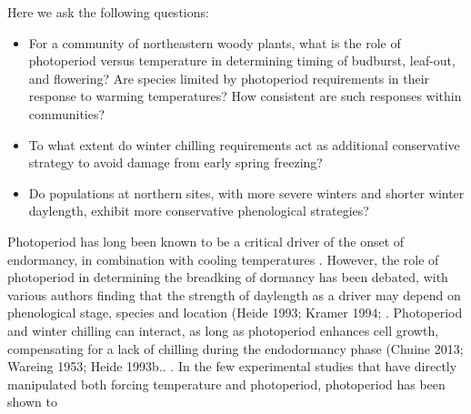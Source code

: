 \documentclass{article}
\begin{document}
Here we ask the following questions:
\begin{itemize}
\item{For a community of northeastern woody plants, what is the role of photoperiod versus temperature in determining timing of budburst, leaf-out, and flowering? Are species limited by photoperiod requirements in their response to warming temperatures? How consistent are such responses within communities?}
\item{To what extent do winter chilling requirements act as additional conservative strategy to avoid damage from early spring freezing?}
\item{Do populations at northern sites, with more severe winters and shorter winter daylength, exhibit more conservative phenological strategies?}
\end{itemize}


Photoperiod has long been known to be a critical driver of the onset of endormancy, in combination with cooling temperatures \cite{Foley:2009aa}. However, the role of photoperiod in determining the breadking of dormancy has been debated, with various authors finding that the strength of daylength as a driver may depend on phenological stage, species and location (Heide 1993; Kramer 1994; \cite{Falusi:1996aa}. Photoperiod and winter chilling can interact, as long as photoperiod enhances cell growth, compensating for a lack of chilling during the endodormancy phase (Chuine 2013; Wareing 1953; Heide 1993b.. \cite{Caffarra:2011aa} \cite{Myking:1995aa}. In the few experimental studies that have directly manipulated both forcing temperature and photoperiod, photoperiod has been shown to 
\end{document}
